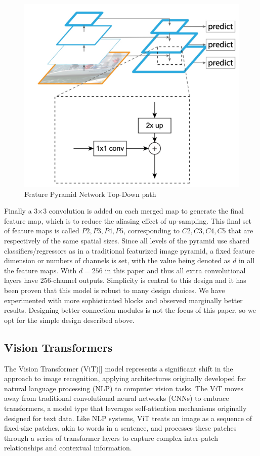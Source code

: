 \begin{figure}[h!]
    \centering
    \includegraphics[scale=0.5]{Figures/fpn-top-down.jpg}
    \caption{Feature Pyramid Network Top-Down path}
    \label{fig:fpn-top}
\end{figure}


Finally a 3×3 convolution is added on each merged map to generate the final feature map, which is to reduce the aliasing effect of up-sampling. 
This final set of feature maps is called ${P2, P3, P4, P5}$, corresponding to ${C2, C3, C4, C5}$ that are respectively of the same spatial sizes.
Since all levels of the pyramid use shared classifiers/regressors as in a traditional featurized image pyramid, a fixed feature dimension 
or numbers of channels is set, with the value being denoted as $d$ in all the feature maps. With $d = 256$ in this paper and thus all extra convolutional 
layers have 256-channel outputs. Simplicity is central to this design and it has been proven that this model is robust to many design choices. We have 
experimented with more sophisticated  blocks and observed marginally better results. Designing better connection modules is not the focus of this paper, 
so we opt for the simple design described above.


\subsection{Vision Transformers}

The Vision Transformer (ViT)[] model represents a significant shift in the approach to image recognition, applying architectures originally developed for 
natural language processing (NLP) to computer vision tasks. The ViT moves away from traditional convolutional neural networks (CNNs) to embrace transformers, 
a model type that leverages self-attention mechanisms originally designed for text data. Like NLP systems, ViT treats an image as a sequence of 
fixed-size patches, akin to words in a sentence, and processes these patches through a series of transformer layers to capture complex inter-patch 
relationships and contextual information.

